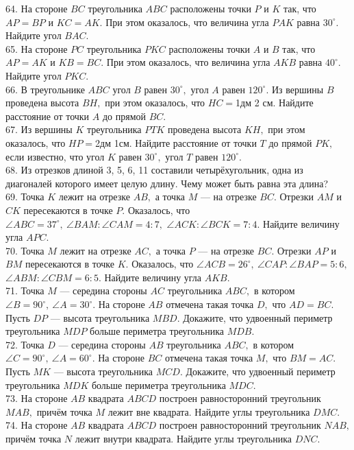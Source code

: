 64. На стороне $BC$ треугольника $ABC$ расположены точки $P$ и $K$ так, что $AP=BP$ и $KC=AK.$ При этом оказалось, что величина угла $PAK$ равна $30^\circ.$ Найдите угол $BAC.$\\
65. На стороне $PC$ треугольника $PKC$ расположены точки $A$ и $B$ так, что $AP=AK$ и $KB=BC.$ При этом оказалось, что величина угла $AKB$ равна $40^\circ.$ Найдите угол $PKC.$\\
66. В треугольнике $ABC$ угол $B$ равен $30^\circ,$ угол $A$ равен $120^\circ.$ Из вершины $B$ проведена высота $BH,$ при этом оказалось, что $HC=$1дм 2 см. Найдите расстояние от точки $A$ до прямой $BC.$\\
67. Из вершины $K$ треугольника $PTK$ проведена высота $KH,$ при этом оказалось, что $HP=$2дм 1см. Найдите расстояние от точки $T$ до прямой $PK,$ если известно, что угол $K$ равен $30^\circ,$ угол $T$ равен $120^\circ.$\\
68. Из отрезков длиной 3, 5, 6, 11 составили четырёхугольник, одна из диагоналей которого имеет целую длину. Чему может быть равна эта длина?\\
69. Точка $K$ лежит на отрезке $AB,$ а точка $M$ --- на отрезке $BC.$ Отрезки $AM$ и $CK$ пересекаются в точке $P.$ Оказалось, что $\angle ABC=37^\circ,\ \angle BAM : \angle CAM=4:7,$ $\angle ACK: \angle BCK=7:4.$ Найдите величину угла $APC.$\\
70. Точка $M$ лежит на отрезке $AC,$ а точка $P$ --- на отрезке $BC.$ Отрезки $AP$ и $BM$ пересекаются в точке $K.$ Оказалось, что $\angle ACB=26^\circ,\ \angle CAP : \angle BAP=5:6,$ $\angle ABM: \angle CBM=6:5.$ Найдите величину угла $AKB.$\\
71. Точка $M$ --- середина стороны $AC$ треугольника $ABC,$ в котором $\angle B=90^\circ,\ \angle A=30^{\circ}.$ На стороне $AB$ отмечена такая точка $D,$ что $AD=BC.$ Пусть $DP$ --- высота треугольника $MBD.$ Докажите, что удвоенный периметр треугольника $MDP$ больше периметра треугольника $MDB.$\\
72. Точка $D$ --- середина стороны $AB$ треугольника $ABC,$ в котором $\angle C=90^{\circ},\ \angle A=60^{\circ}.$ На стороне $BC$ отмечена такая точка $M,$ что $BM=AC.$ Пусть $MK$ --- высота треугольника $MCD.$ Докажите, что удвоенный периметр треугольника $MDK$ больше периметра треугольника $MDC.$\\
73. На стороне $AB$ квадрата $ABCD$ построен равносторонний треугольник $MAB,$ причём точка $M$ лежит вне квадрата. Найдите углы треугольника $DMC.$\\
74. На стороне $AB$ квадрата $ABCD$ построен равносторонний треугольник $NAB,$ причём точка $N$ лежит внутри квадрата. Найдите углы треугольника $DNC.$\\
